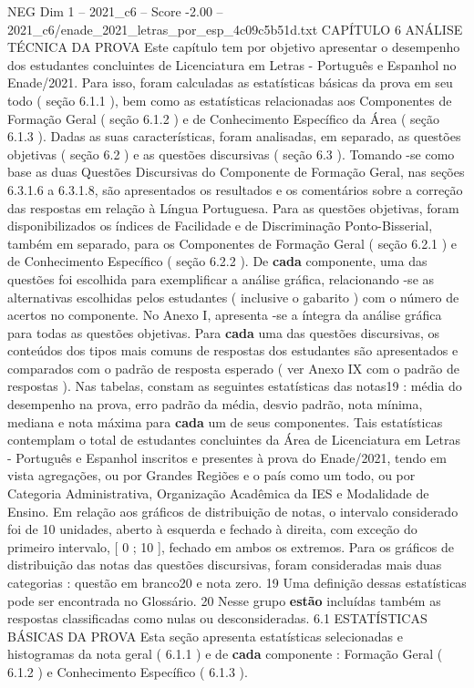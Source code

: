 \begin{textsample}{NEG Dim 1 – 2021\_c6 – Score -2.00 – 2021\_c6/enade\_2021\_letras\_por\_esp\_4c09c5b51d.txt}  \label{ex:f1_neg_239}
CAPÍTULO 6 ANÁLISE TÉCNICA DA PROVA Este capítulo tem por objetivo apresentar o desempenho dos estudantes concluintes de Licenciatura em Letras - Português e Espanhol no Enade/2021.
Para isso, foram calculadas as estatísticas básicas da prova em seu todo ( seção 6.1.1 ), bem como as estatísticas relacionadas aos Componentes de Formação Geral ( seção 6.1.2 ) e de Conhecimento Específico da Área ( seção 6.1.3 ).
Dadas as suas características, foram analisadas, em separado, as questões objetivas ( seção 6.2 ) e as questões discursivas ( seção 6.3 ).
Tomando -se como base as duas Questões Discursivas do Componente de Formação Geral, nas seções 6.3.1.6 a 6.3.1.8, são apresentados os resultados e os comentários sobre a correção das respostas em relação à Língua Portuguesa.
Para as questões objetivas, foram disponibilizados os índices de Facilidade e de Discriminação Ponto-Bisserial, também em separado, para os Componentes de Formação Geral ( seção 6.2.1 ) e de Conhecimento Específico ( seção 6.2.2 ).
De \textbf{cada} componente, uma das questões foi escolhida para exemplificar a análise gráfica, relacionando -se as alternativas escolhidas pelos estudantes ( inclusive o gabarito ) com o número de acertos no componente.
No Anexo I, apresenta -se a íntegra da análise gráfica para todas as questões objetivas.
Para \textbf{cada} uma das questões discursivas, os conteúdos dos tipos mais comuns de respostas dos estudantes são apresentados e comparados com o padrão de resposta esperado ( ver Anexo IX com o padrão de respostas ).
Nas tabelas, constam as seguintes estatísticas das notas19 : média do desempenho na prova, erro padrão da média, desvio padrão, nota mínima, mediana e nota máxima para \textbf{cada} um de seus componentes.
Tais estatísticas contemplam o total de estudantes concluintes da Área de Licenciatura em Letras - Português e Espanhol inscritos e presentes à prova do Enade/2021, tendo em vista agregações, ou por Grandes Regiões e o país como um todo, ou por Categoria Administrativa, Organização Acadêmica da IES e Modalidade de Ensino.
Em relação aos gráficos de distribuição de notas, o intervalo considerado foi de 10 unidades, aberto à esquerda e fechado à direita, com exceção do primeiro intervalo, [ 0 ; 10 ], fechado em ambos os extremos.
Para os gráficos de distribuição das notas das questões discursivas, foram consideradas mais duas categorias : questão em branco20 e nota zero. 19 Uma definição dessas estatísticas pode ser encontrada no Glossário. 20 Nesse grupo \textbf{estão} incluídas também as respostas classificadas como nulas ou desconsideradas. 6.1 ESTATÍSTICAS BÁSICAS DA PROVA Esta seção apresenta estatísticas selecionadas e histogramas da nota geral ( 6.1.1 ) e de \textbf{cada} componente : Formação Geral ( 6.1.2 ) e Conhecimento Específico ( 6.1.3 ).

\end{textsample}
